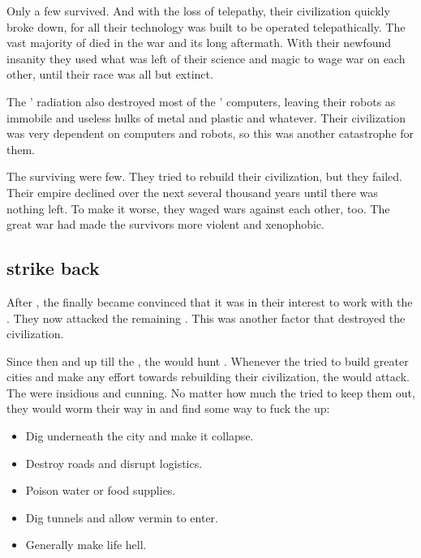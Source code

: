 Only a few survived. 
And with the loss of telepathy, their civilization quickly broke down, for all their technology was built to be operated telepathically. 
The vast majority of \ophidians{} died in the war and its long aftermath. 
With their newfound insanity they used what was left of their science and magic to wage war on each other, until their race was all but extinct. 

The \banes' radiation also destroyed most of the \ophidians' computers, leaving their robots as immobile and useless hulks of metal and plastic and whatever.
Their civilization was very dependent on computers and robots, so this was another catastrophe for them.

The surviving \ophidians were few. 
They tried to rebuild their civilization, but they failed. 
Their empire declined over the next several thousand years until there was nothing left. 
To make it worse, they waged wars against each other, too. 
The great war had made the survivors more violent and xenophobic. 





\subsection{\Noggyaleth strike back}
After , the \noggyaleth finally became convinced that it was in their interest to work with the \banes. 
They now attacked the remaining \ophidians. 
This was another factor that destroyed the \ophidian civilization. 

Since then and up till the \thirdbanewar, the \noggyaleth would hunt \ophidians.
Whenever the \ophidians tried to build greater cities and make any effort towards rebuilding their civilization, the \noggyaleth would attack. 
The \noggyaleth were insidious and cunning.
No matter how much the \ophidians tried to keep them out, they would worm their way in and find some way to fuck the \ophidians up:
\begin{itemize}
  \item Dig underneath the city and make it collapse.
  \item Destroy roads and disrupt logistics. 
  \item Poison water or food supplies.
  \item Dig tunnels and allow vermin to enter. 
  \item Generally make life hell. 
\end{itemize}









